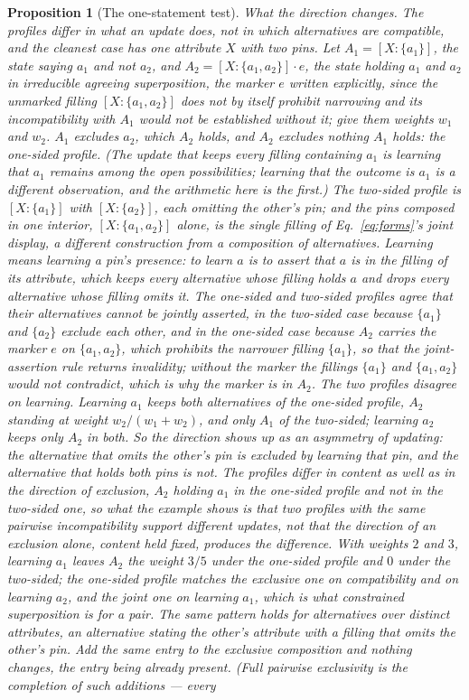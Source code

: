 \documentclass[11pt]{article}
\newtheorem{proposition}{Proposition}
\begin{document}
\begin{proposition}[The one-statement test]
\noindent\emph{What the direction changes.} The profiles differ in what an update does, not in which alternatives are compatible, and the cleanest case has one attribute $X$ with two pins. Let $A_1 = [X : \{a_1\}]$, the state saying $a_1$ and not $a_2$, and $A_2 = [X : \{a_1, a_2\}] \cdot e$, the state holding $a_1$ and $a_2$ in irreducible agreeing superposition, the marker $e$ written explicitly, since the unmarked filling $[X : \{a_1, a_2\}]$ does not by itself prohibit narrowing and its incompatibility with $A_1$ would not be established without it; give them weights $w_1$ and $w_2$. $A_1$ excludes $a_2$, which $A_2$ holds, and $A_2$ excludes nothing $A_1$ holds: the one-sided profile. (The update that keeps every filling containing $a_1$ is learning that $a_1$ remains among the open possibilities; learning that the outcome is $a_1$ is a different observation, and the arithmetic here is the first.) The two-sided profile is $[X : \{a_1\}]$ with $[X : \{a_2\}]$, each omitting the other's pin; and the pins composed in one interior, $[X : \{a_1, a_2\}]$ alone, is the single filling of Eq.~\eqref{eq:forms}'s joint display, a different construction from a composition of alternatives. Learning means learning a pin's presence: to learn $a$ is to assert that $a$ is in the filling of its attribute, which keeps every alternative whose filling holds $a$ and drops every alternative whose filling omits it. The one-sided and two-sided profiles agree that their alternatives cannot be jointly asserted, in the two-sided case because $\{a_1\}$ and $\{a_2\}$ exclude each other, and in the one-sided case because $A_2$ carries the marker $e$ on $\{a_1, a_2\}$, which prohibits the narrower filling $\{a_1\}$, so that the joint-assertion rule returns invalidity; without the marker the fillings $\{a_1\}$ and $\{a_1, a_2\}$ would not contradict, which is why the marker is in $A_2$. The two profiles disagree on learning. Learning $a_1$ keeps both alternatives of the one-sided profile, $A_2$ standing at weight $w_2/(w_1 + w_2)$, and only $A_1$ of the two-sided; learning $a_2$ keeps only $A_2$ in both. So the direction shows up as an asymmetry of updating: the alternative that omits the other's pin is excluded by learning that pin, and the alternative that holds both pins is not. The profiles differ in content as well as in the direction of exclusion, $A_2$ holding $a_1$ in the one-sided profile and not in the two-sided one, so what the example shows is that two profiles with the same pairwise incompatibility support different updates, not that the direction of an exclusion alone, content held fixed, produces the difference. With weights $2$ and $3$, learning $a_1$ leaves $A_2$ the weight $3/5$ under the one-sided profile and $0$ under the two-sided; the one-sided profile matches the exclusive one on compatibility and on learning $a_2$, and the joint one on learning $a_1$, which is what constrained superposition is for a pair. The same pattern holds for alternatives over distinct attributes, an alternative stating the other's attribute with a filling that omits the other's pin. Add the same entry to the exclusive composition and nothing changes, the entry being already present. (Full pairwise exclusivity is the completion of such additions --- every 
\end{proposition}
\end{document}
